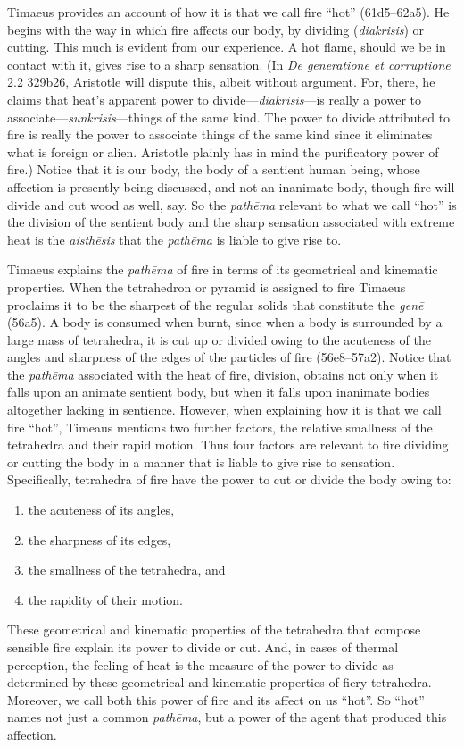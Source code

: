Timaeus provides an account of how it is that we call fire ``hot'' (61d5--62a5). He begins with the way in which fire affects our body, by dividing (\emph{diakrisis}) or cutting. This much is evident from our experience. A hot flame, should we be in contact with it, gives rise to a sharp sensation. (In \emph{De generatione et corruptione} 2.2 329b26, Aristotle will dispute this, albeit without argument. For, there, he claims that heat's apparent power to divide---\emph{diakrisis}---is really a power to associate---\emph{sunkrisis}---things of the same kind. The power to divide attributed to fire is really the power to associate things of the same kind since it eliminates what is foreign or alien. Aristotle plainly has in mind the purificatory power of fire.) Notice that it is our body, the body of a sentient human being, whose affection is presently being discussed, and not an inanimate body, though fire will divide and cut wood as well, say. So the \emph{pathēma} relevant to what we call ``hot'' is the division of the sentient body and the sharp sensation associated with extreme heat is the \emph{aisthēsis} that the \emph{pathēma} is liable to give rise to. 

Timaeus explains the \emph{pathēma} of fire in terms of its geometrical and kinematic properties. When the tetrahedron or pyramid is assigned to fire Timaeus proclaims it to be the sharpest of the regular solids that constitute the \emph{genē} (56a5). A body is consumed when burnt, since when a body is surrounded by a large mass of tetrahedra, it is cut up or divided owing to the acuteness of the angles and sharpness of the edges of the particles of fire (56e8--57a2). Notice that the \emph{pathēma} associated with the heat of fire, division, obtains not only when it falls upon an animate sentient body, but when it falls upon inanimate bodies altogether lacking in sentience. However, when explaining how it is that we call fire ``hot'', Timeaus mentions two further factors, the relative smallness of the tetrahedra and their rapid motion. Thus four factors are relevant to fire dividing or cutting the body in a manner that is liable to give rise to sensation. Specifically, tetrahedra of fire have the power to cut or divide the body owing to:
\begin{enumerate}
	\item the acuteness of its angles,
	\item the sharpness of its edges,
	\item the smallness of the tetrahedra, and
	\item the rapidity of their motion.
\end{enumerate}
These geometrical and kinematic properties of the tetrahedra that compose sensible fire explain its power to divide or cut. And, in cases of thermal perception, the feeling of heat is the measure of the power to divide as determined by these geometrical and kinematic properties of fiery tetrahedra. Moreover, we call both this power of fire and its affect on us ``hot''. So ``hot'' names not just a common \emph{pathēma}, but a power of the agent that produced this affection. 

